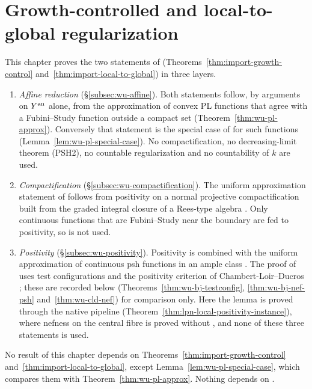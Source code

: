 \section{Growth-controlled and local-to-global regularization}\label{sec:wu-discharge}

This chapter proves the two statements of \cite[Lemma~5.11(5),(6)]{FHX}
(Theorems~\ref{thm:import-growth-control} and~\ref{thm:import-local-to-global}) in three layers.
\begin{enumerate}
\item \emph{Affine reduction} (\S\ref{subsec:wu-affine}). Both statements follow, by arguments on
$Y^{\mathrm{an}}$ alone, from the approximation of convex PL functions that agree with a Fubini--Study function
outside a compact set (Theorem~\ref{thm:wu-pl-approx}). Conversely that statement is the special case of
\cite[Lemma~5.11(5),(6)]{FHX} for such functions (Lemma~\ref{lem:wu-pl-special-case}). No
compactification, no decreasing-limit theorem (PSH2), no countable regularization
\cite[Corollary~12.18]{BJ22} and no countability of $k$ are used.
\item \emph{Compactification} (\S\ref{subsec:wu-compactification}).
The uniform approximation statement of \cite[Lemma~3.24(1)]{Wu26}
follows from positivity on a normal projective compactification
built from the graded integral closure of a Rees-type algebra \cite[Lemma~5.9]{FHX}. Only continuous
functions that are Fubini--Study near the boundary are fed to positivity, so \cite[Lemma~5.10]{FHX} is
not used.
\item \emph{Positivity} (\S\ref{subsec:wu-positivity}). Positivity is \cite[Lemma~5.5]{FHX} combined
with the uniform approximation of continuous psh functions in an ample class \cite{BJ22}. The proof of
\cite[Lemma~5.5]{FHX} uses test configurations \cite{BJ22} and the positivity criterion of Chambert-Loir--Ducros
\cite{CLD12}; these are recorded below (Theorems~\ref{thm:wu-bj-testconfig}, \ref{thm:wu-bj-nef-psh}
and~\ref{thm:wu-cld-nef}) for comparison only. Here the lemma is proved through the native pipeline
(Theorem~\ref{thm:lpn-local-positivity-instance}), where nefness on the central fibre is proved without
\cite{CLD12}, and none of these three statements is used.
\end{enumerate}
No result of this chapter depends on Theorems~\ref{thm:import-growth-control}
and~\ref{thm:import-local-to-global}, except Lemma~\ref{lem:wu-pl-special-case}, which compares them with
Theorem~\ref{thm:wu-pl-approx}. Nothing depends on \cite[Theorem~6.21]{BJ22}.

